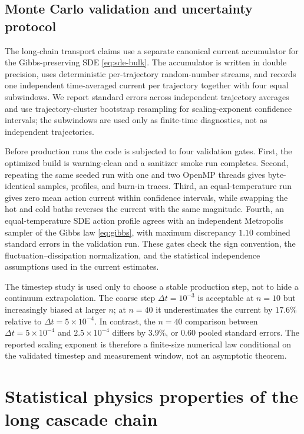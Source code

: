 \documentclass[11pt,a4paper]{article}
\theoremstyle{definition}
\numberwithin{equation}{section}   %
\begin{document}
\subsection{Monte Carlo validation and uncertainty protocol}\label{sec:mc-validation}

The long-chain transport claims use a separate canonical current accumulator
for the Gibbs-preserving SDE \eqref{eq:sde-bulk}. The accumulator is written in
double precision, uses deterministic per-trajectory random-number streams, and
records one independent time-averaged current per trajectory together with four
equal subwindows. We report standard errors across independent trajectory
averages and use trajectory-cluster bootstrap resampling for scaling-exponent
confidence intervals; the subwindows are used only as finite-time diagnostics,
not as independent trajectories.

Before production runs the code is subjected to four validation gates. First,
the optimized build is warning-clean and a sanitizer smoke run completes.
Second, repeating the same seeded run with one and two OpenMP threads gives
byte-identical samples, profiles, and burn-in traces. Third, an
equal-temperature run gives zero mean action current within confidence
intervals, while swapping the hot and cold baths reverses the current with the
same magnitude. Fourth, an equal-temperature SDE action profile agrees with an
independent Metropolis sampler of the Gibbs law \eqref{eq:gibbs}, with maximum
discrepancy $1.10$ combined standard errors in the validation run. These gates
check the sign convention, the fluctuation--dissipation normalization, and the
statistical independence assumptions used in the current estimates.

The timestep study is used only to choose a stable production step, not to hide
a continuum extrapolation. The coarse step $\Delta t=10^{-3}$ is acceptable at
$n=10$ but increasingly biased at larger $n$; at $n=40$ it underestimates the
current by $17.6\%$ relative to $\Delta t=5\times10^{-4}$. In contrast, the
$n=40$ comparison between $\Delta t=5\times10^{-4}$ and
$2.5\times10^{-4}$ differs by $3.9\%$, or $0.60$ pooled standard errors. The
reported scaling exponent is therefore a finite-size numerical law conditional
on the validated timestep and measurement window, not an asymptotic theorem.

\section{Statistical physics properties of the long cascade chain}\label{sec:long-chain}
\end{document}
